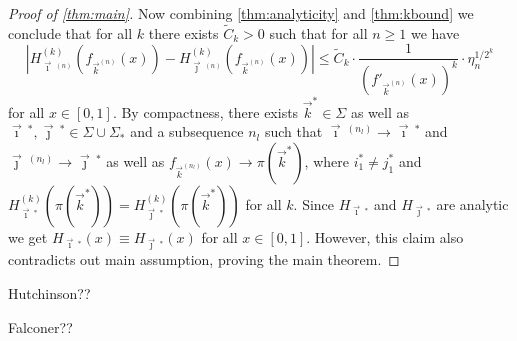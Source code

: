 \documentclass[12pt,]{article}
\theoremstyle{definition}
\theoremstyle{remark}
\newcommand{\0}{\mathbf{0}}
\newcommand{\bi}{\vec{\imath}\,}
\newcommand{\bj}{\vec{\jmath}\,}
\newcommand{\bk}{{\vec{k}}}
\begin{document}
\begin{proof}[Proof of \cref{thm:main}]
  Now combining \cref{thm:analyticity} and \cref{thm:kbound} we conclude that for all $k$ there
  exists $\widetilde{C}_k>0$ such that for all $n\geq 1$ we have
  \[
    |H_{\bi^{(n)}}^{(k)}(f_{\bk^{(n)}}(x)) - H_{\bj^{(n)}}^{(k)}(f_{\bk^{(n)}}(x))|
  \leq \widetilde{C}_k \cdot \frac{1}{(f'_{\bk^{(n)}}(x))^k}\cdot\eta_n^{1/2^k}
  \]
  for all $x\in[0,1]$.
  By compactness, there exists $\bk^*\in\Sigma$ as well as $\bi^*,\bj^*\in\Sigma\cup\Sigma_*$ and a
  subsequence $n_l$ such that $\bi^{(n_l)}\to \bi^*$ and $\bj^{(n_l)}\to \bj^*$ as well as
  $f_{\bk^{(n_l)}}(x) \to \pi(\bk^*)$, where $i_1^*\neq j_1^*$ and
  $H_{\bi^*}^{(k)}(\pi(\bk^*))=H_{\bj^*}^{(k)}(\pi(\bk^*))$ for all $k$.
  Since $H_{\bi^*}$ and $H_{\bj^*}$ are analytic we get $H_{\bi^*}(x)\equiv H_{\bj^*}(x)$ for all
  $x\in[0,1]$. However, this claim also contradicts out main assumption, proving the main theorem.
\end{proof}

\begin{thebibliography}{99}
  Hutchinson??

  Falconer??

\end{thebibliography}
\end{document}
